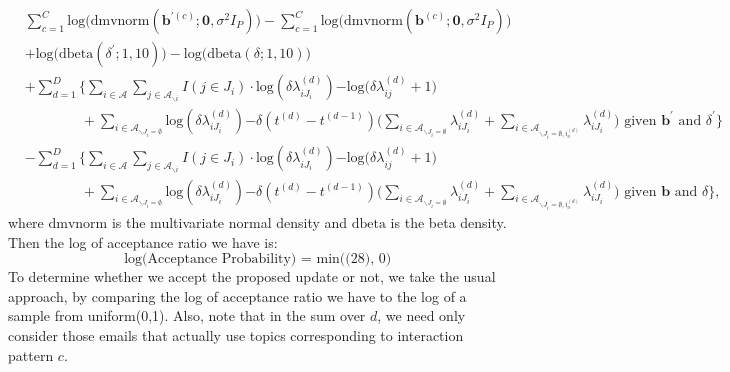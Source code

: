 \documentclass[a4paper]{article}
\begin{document}
 \begin{equation}
 \begin{aligned} 
 &\sum_{c=1}^C\mbox{log}\Big(\mbox{dmvnorm}(\boldsymbol{b}^{\prime(c)};\mathbf{0}, \sigma^2I_{P})\Big)-\sum_{c=1}^C\mbox{log}\Big(\mbox{dmvnorm}(\boldsymbol{b}^{(c)};\mathbf{0}, \sigma^2I_P)\Big)\\&+\mbox{log}\Big(\mbox{dbeta}(\delta^\prime ;1, 10)\Big)-\mbox{log}\Big(\mbox{dbeta}(\delta;1, 10)\Big)\\&+  \sum_{d=1}^D\Big\{\sum_{i\in \mathcal{A}}\sum_{j \in \mathcal{A}_{\backslash i }} {I(j \in J_i)}\cdot\mbox{log}(\delta\lambda^{(d)}_{iJ_i}) {-\mbox{log}(\delta\lambda^{(d)}_{ij}}+1)\\&\quad\quad\quad\quad + \sum_{i\in \mathcal{A}_{\backslash J_i=\emptyset}} \mbox{log}(\delta\lambda^{(d)}_{iJ_i}){-\delta(t^{(d)}-t^{(d-1)})\Big(\sum\limits_{i \in \mathcal{A}_{\backslash J_i=\emptyset}}\lambda^{(d)}_{i{J_i}}+\sum\limits_{i \in \mathcal{A}_{\backslash J_i=\emptyset, i_o^{(d)}}}\lambda^{(d)}_{i{J_i}}\Big)} \mbox{ given } \boldsymbol{b}^{\prime} \mbox{ and }\delta^\prime \Big\}
 \\& -\sum_{d=1}^D\Big\{\sum_{i\in \mathcal{A}}\sum_{j \in \mathcal{A}_{\backslash i }} {I(j \in J_i)}\cdot\mbox{log}(\delta\lambda^{(d)}_{iJ_i}) {-\mbox{log}(\delta\lambda^{(d)}_{ij}}+1)\\&\quad\quad\quad\quad + \sum_{i\in \mathcal{A}_{\backslash J_i=\emptyset}} \mbox{log}(\delta\lambda^{(d)}_{iJ_i}){-\delta(t^{(d)}-t^{(d-1)})\Big(\sum\limits_{i \in \mathcal{A}_{\backslash J_i=\emptyset}}\lambda^{(d)}_{i{J_i}}+\sum\limits_{i \in \mathcal{A}_{\backslash J_i=\emptyset, i_o^{(d)}}}\lambda^{(d)}_{i{J_i}}\Big)}\mbox{ given } \boldsymbol{b} \mbox{ and }\delta \Big\},
 \end{aligned}
 \end{equation}
 where $\mbox{dmvnorm}$ is the multivariate normal density and $\mbox{dbeta}$ is the beta density. Then the log of acceptance ratio we have is:
 \begin{equation}
 \mbox{log(Acceptance Probability) = min((28), 0) }
 \end{equation}
 To determine whether we accept the proposed update or not, we take the usual approach, by comparing the log of acceptance ratio we have to the log of a sample from uniform(0,1). Also, note that in the sum over $d$, we need only consider those emails that actually use topics corresponding to interaction pattern $c$.  
\end{document}
